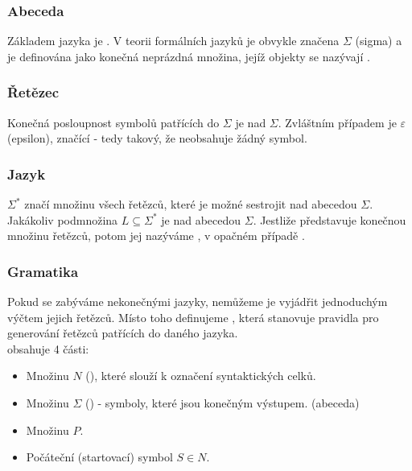 \subsubsection*{Abeceda}

Základem jazyka je . V teorii formálních jazyků je obvykle značena
$\Sigma$ (sigma) a je definována jako konečná neprázdná množina, jejíž objekty
se nazývají .

\subsubsection*{Řetězec}

Konečná posloupnost symbolů patřících do $\Sigma$ je  nad $\Sigma$.
Zvláštním případem je $\varepsilon$ (epsilon), značící  -
tedy takový, že neobsahuje žádný symbol.

\subsubsection*{Jazyk}

$\Sigma^*$ značí množinu všech řetězců, které je možné sestrojit nad abecedou $\Sigma$.
Jakákoliv podmnožina $L \subseteq \Sigma^*$ je  nad abecedou $\Sigma$.
Jestliže  představuje konečnou množinu řetězců, potom jej nazýváme ,
v opačném případě .

\subsubsection*{Gramatika}

Pokud se zabýváme nekonečnými jazyky, nemůžeme je vyjádřit jednoduchým výčtem jejich
řetězců. Místo toho definujeme , která stanovuje pravidla pro generování
řetězců patřících do daného jazyka.\\

\noindent
{} obsahuje 4 části:
\begin{itemize}
  \item Množinu  $N$ (), které slouží k označení syntaktických celků.
  \item Množinu  $\Sigma$ () - symboly, které jsou konečným výstupem. (abeceda)
  \item Množinu  $P$.
  \item Počáteční (startovací) symbol $S \in N$.
\end{itemize}

